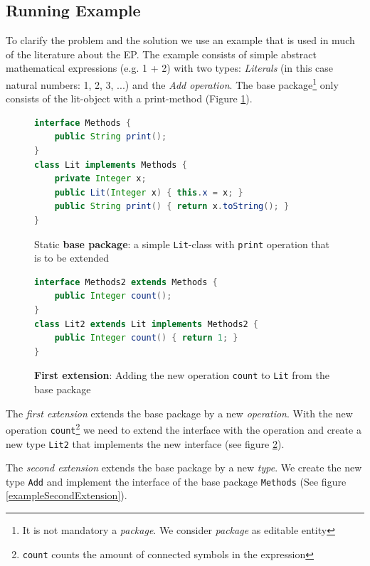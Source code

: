 \documentclass{report}
\begin{document}
\subsection{Running Example}

To clarify the problem and the solution we use an example that is used in much of the literature about the EP. The example consists of simple abstract mathematical expressions (e.g. 1 + 2) with two types: \emph{Literals} (in this case natural numbers: 1, 2, 3, ...) and the \emph{Add operation}. The base package\footnote{It is not mandatory a \emph{package}. We consider \emph{package} as editable entity} only consists of the lit-object with a print-method (Figure \ref{exampleLitBaseClass}).


\begin{figure}[H]
\begin{lstlisting}[language=java]
interface Methods {
    public String print();
}
class Lit implements Methods {
    private Integer x;
    public Lit(Integer x) { this.x = x; }
    public String print() { return x.toString(); }
}
\end{lstlisting}
\caption{Static \textbf{base package}: a simple \lstinline{Lit}-class with \lstinline{print} operation that is to be extended}
\label{exampleLitBaseClass}
\end{figure}
\begin{figure}[H]
\begin{lstlisting}[language=java]
interface Methods2 extends Methods {
    public Integer count();
}
class Lit2 extends Lit implements Methods2 {
    public Integer count() { return 1; }
}
\end{lstlisting}
\caption{\textbf{First extension}: Adding the new operation \lstinline{count} to \lstinline{Lit} from the base package}
\label{exampleFirstExtension}
\end{figure}

The \emph{first extension} extends the base package by a new \emph{operation}. With the new operation \lstinline{count}\footnote{\lstinline{count} counts the amount of connected symbols in the expression} we need to extend the interface with the operation and create a new type \lstinline{Lit2} that implements the new interface (see figure \ref{exampleFirstExtension}).

The \emph{second extension} extends the base package by a new \emph{type}. We create the new type \lstinline{Add} and implement the interface of the base package \lstinline{Methods} (See figure \ref{exampleSecondExtension}).
\end{document}
